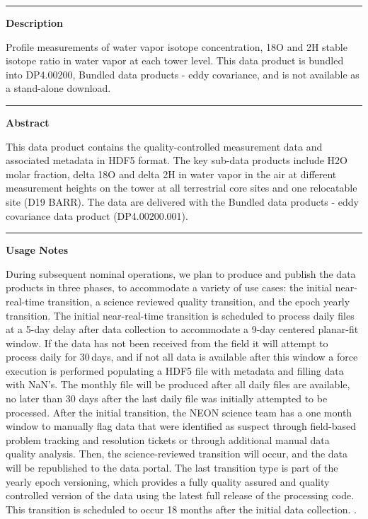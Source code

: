\documentclass[]{article}
\begin{document}
\begin{center}\rule{0.5\linewidth}{\linethickness}\end{center}

\textbf{Description}

Profile measurements of water vapor isotope concentration, 18O and 2H
stable isotope ratio in water vapor at each tower level. This data
product is bundled into DP4.00200, Bundled data products - eddy
covariance, and is not available as a stand-alone download.

\begin{center}\rule{0.5\linewidth}{\linethickness}\end{center}

\textbf{Abstract}

This data product contains the quality-controlled measurement data and
associated metadata in HDF5 format. The key sub-data products include
H2O molar fraction, delta 18O and delta 2H in water vapor in the air at
different measurement heights on the tower at all terrestrial core sites
and one relocatable site (D19 BARR). The data are delivered with the
Bundled data products - eddy covariance data product (DP4.00200.001).

\begin{center}\rule{0.5\linewidth}{\linethickness}\end{center}

\textbf{Usage Notes}

During subsequent nominal operations, we plan to produce and publish the
data products in three phases, to accommodate a variety of use cases:
the initial near-real-time transition, a science reviewed quality
transition, and the epoch yearly transition. The initial near-real-time
transition is scheduled to process daily files at a 5-day delay after
data collection to accommodate a 9-day centered planar-fit window. If
the data has not been received from the field it will attempt to process
daily for 30\,days, and if not all data is available after this window a
force execution is performed populating a HDF5 file with metadata and
filling data with NaN's. The monthly file will be produced after all
daily files are available, no later than 30 days after the last daily
file was initially attempted to be processed. After the initial
transition, the NEON science team has a one month window to manually
flag data that were identified as suspect through field-based problem
tracking and resolution tickets or through additional manual data
quality analysis. Then, the science-reviewed transition will occur, and
the data will be republished to the data portal. The last transition
type is part of the yearly epoch versioning, which provides a fully
quality assured and quality controlled version of the data using the
latest full release of the processing code. This transition is scheduled
to occur 18 months after the initial data collection. \newpage
.
\end{document}
